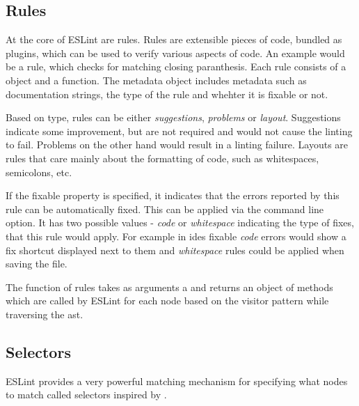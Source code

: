 \subsection{Rules}
At the core of ESLint are rules. Rules are extensible pieces of code, bundled as plugins, which can be used to verify various aspects of code. An example would be a rule, which checks for matching closing paranthesis. 
Each rule consists of a  object
and a  function. The metadata object includes metadata such as documentation strings, the type of the rule and whehter it is fixable or not.

Based on type, rules can be either \textit{suggestions}, \textit{problems} or \textit{layout}. Suggestions indicate some improvement, but are not required and would not cause the linting to fail. Problems on the other hand would result in a linting failure. Layouts are rules that care mainly about the formatting of code, such as whitespaces, semicolons, etc. 

If the fixable property is specified, it indicates that the errors reported by this rule can be automatically fixed. This can be applied via the  command line option. It has two possible values - \textit{code} or \textit{whitespace} indicating the type of fixes, that this rule would apply. For example in \glspl{ide} fixable \textit{code} errors would show a fix shortcut displayed next to them and \textit{whitespace} rules could be applied when saving the file.

The  function of rules takes as arguments a  and returns an object of methods which are called by ESLint for each node based on the \gls{visitor} pattern while traversing the \gls{ast}. 

\subsection{Selectors}
ESLint provides a very powerful matching mechanism for specifying what nodes to match called selectors \parencite{eslintSelectors} inspired by \textcite{estoolsEsQuery}.

